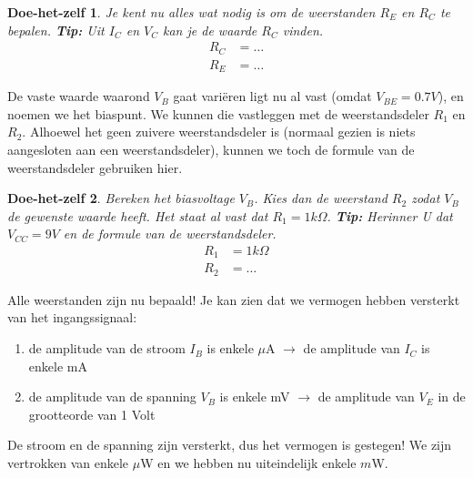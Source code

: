 \documentclass{article}
\newtheorem{DIY}{Doe-het-zelf}
\begin{document}
				\begin{DIY} Je kent nu alles wat nodig is om de weerstanden $R_{E}$ en $ R_{C}$ te bepalen. \textbf{Tip:} Uit $I_C$ en $V_C$ kan je de waarde $R_C$ vinden.
				\begin{align}
				    R_C &= \ldots \\
				    R_E &= \ldots
				\end{align}
				\end{DIY}				

				De vaste waarde waarond $V_B$ gaat vari\"eren ligt nu al vast (omdat $V_{BE} = 0.7V$), en noemen we het biaspunt. We kunnen die vastleggen met de weerstandsdeler $R_1$ en $R_2$. Alhoewel het geen zuivere weerstandsdeler is (normaal gezien is niets aangesloten aan een weerstandsdeler), kunnen we toch de formule van de weerstandsdeler gebruiken hier.

				\begin{DIY} Bereken het biasvoltage $V_B$. Kies dan de weerstand $R_2$ zodat $V_B$ de gewenste waarde heeft. Het staat al vast dat $R_1 = 1k\Omega$. \textbf{Tip:} Herinner U dat $V_{CC} = 9V$ en de formule van de weerstandsdeler.
				\begin{align}
				    R_1 &= 1k\Omega \\
				    R_2 &= \ldots
				\end{align}
				\end{DIY}

				Alle weerstanden zijn nu bepaald! Je kan zien dat we vermogen hebben versterkt van het ingangssignaal:

				\begin{enumerate}
				 	\item de amplitude van de stroom $I_B$ is enkele $\mu$A $\rightarrow$ de amplitude van $I_C$ is enkele mA
				 	\item de amplitude van de spanning $V_B$ is enkele mV $\rightarrow$ de amplitude van $V_E$ in de grootteorde van 1 Volt
				 \end{enumerate} 

				 De stroom en de spanning zijn  versterkt, dus het vermogen is gestegen! We zijn vertrokken van enkele $\mu$W en we hebben nu uiteindelijk enkele $m$W. 


				\begin{center}
					\noindent {}
				\end{center}
\end{document}
